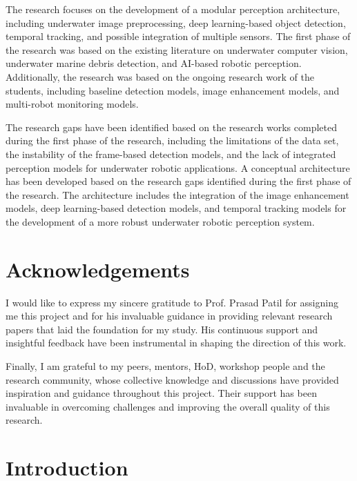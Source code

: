 \documentclass[12pt,a4paper]{report}
\begin{document}
The research focuses on the development of a modular perception architecture, including underwater image preprocessing, deep learning-based object detection, temporal tracking, and possible integration of multiple sensors. The first phase of the research was based on the existing literature on underwater computer vision, underwater marine debris detection, and AI-based robotic perception. Additionally, the research was based on the ongoing research work of the students, including baseline detection models, image enhancement models, and multi-robot monitoring models.

The research gaps have been identified based on the research works completed during the first phase of the research, including the limitations of the data set, the instability of the frame-based detection models, and the lack of integrated perception models for underwater robotic applications. A conceptual architecture has been developed based on the research gaps identified during the first phase of the research. The architecture includes the integration of the image enhancement models, deep learning-based detection models, and temporal tracking models for the development of a more robust underwater robotic perception system.

\clearpage

\chapter*{Acknowledgements}

I would like to express my sincere gratitude to Prof. Prasad Patil for assigning me this project and for his invaluable guidance in providing relevant research papers that laid the foundation for my study. His continuous support and insightful feedback have been instrumental in shaping the direction of this work.

Finally, I am grateful to my peers, mentors, HoD, workshop people and the research community, whose collective knowledge and discussions have provided inspiration and guidance throughout this project. Their support has been invaluable in overcoming challenges and improving the overall quality of this research.

\clearpage

\tableofcontents
\clearpage

\chapter{Introduction}
\end{document}
